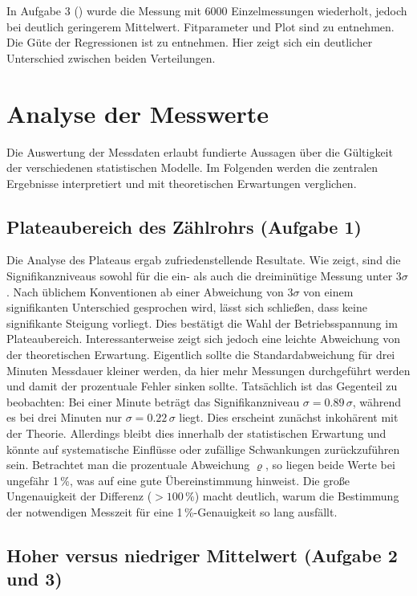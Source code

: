In Aufgabe 3 () wurde die Messung mit 6000 Einzelmessungen wiederholt, jedoch bei deutlich geringerem Mittelwert. Fitparameter und Plot sind  zu entnehmen. Die Güte der Regressionen ist  zu entnehmen. Hier zeigt sich ein deutlicher Unterschied zwischen beiden Verteilungen.

\section{Analyse der Messwerte}
\label{sec:Analyse}

Die Auswertung der Messdaten erlaubt fundierte Aussagen über die Gültigkeit der verschiedenen statistischen Modelle. Im Folgenden werden die zentralen Ergebnisse interpretiert und mit theoretischen Erwartungen verglichen.

\subsection*{Plateaubereich des Zählrohrs (Aufgabe 1)}

Die Analyse des Plateaus ergab zufriedenstellende Resultate. Wie  zeigt, sind die Signifikanzniveaus sowohl für die ein- als auch die dreiminütige Messung unter 3$\sigma$. Nach üblichem Konventionen ab einer Abweichung von 3$\sigma$ von einem signifikanten Unterschied gesprochen wird, lässt sich schließen, dass keine signifikante Steigung vorliegt. Dies bestätigt die Wahl der Betriebsspannung im Plateaubereich.
Interessanterweise zeigt sich jedoch eine leichte Abweichung von der theoretischen Erwartung. Eigentlich sollte die Standardabweichung für drei Minuten Messdauer kleiner werden, da hier mehr Messungen durchgeführt werden und damit der prozentuale Fehler sinken sollte. Tatsächlich ist das Gegenteil zu beobachten: Bei einer Minute beträgt das Signifikanzniveau $\sigma = 0.89\,\sigma$, während es bei drei Minuten nur $\sigma = 0.22\,\sigma$ liegt. Dies erscheint zunächst inkohärent mit der Theorie. Allerdings bleibt dies innerhalb der statistischen Erwartung und könnte auf systematische Einflüsse oder zufällige Schwankungen zurückzuführen sein.
Betrachtet man die prozentuale Abweichung $\varrho$, so liegen beide Werte bei ungefähr 1\,\%, was auf eine gute Übereinstimmung hinweist. Die große Ungenauigkeit der Differenz ($>100\,\%$) macht deutlich, warum die Bestimmung der notwendigen Messzeit für eine 1\,\%-Genauigkeit so lang ausfällt.

\subsection*{Hoher versus niedriger Mittelwert (Aufgabe 2 und 3)}

